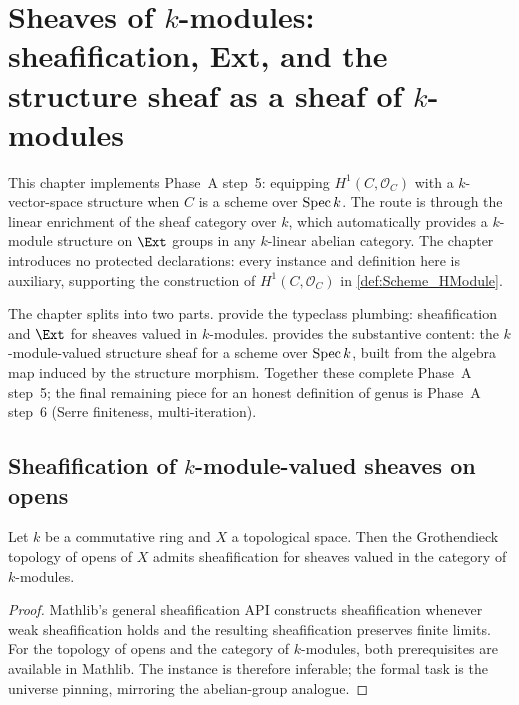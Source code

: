 \chapter{Sheaves of \(k\)-modules: sheafification, Ext, and the structure sheaf as a sheaf of \(k\)-modules}
\label{chap:Cohomology_StructureSheafModuleK}

This chapter implements Phase~A step~5: equipping \(H^1(C, \mathcal O_C)\) with a \(k\)-vector-space structure when \(C\) is a scheme over \(\operatorname{Spec} k\). The route is through the linear enrichment of the sheaf category over \(k\), which automatically provides a \(k\)-module structure on \(\Ext\) groups in any \(k\)-linear abelian category. The chapter introduces no protected declarations: every instance and definition here is auxiliary, supporting the construction of \(H^1(C, \mathcal O_C)\) in \cref{def:Scheme_HModule}.

The chapter splits into two parts.  provide the typeclass plumbing: sheafification and \(\Ext\) for sheaves valued in \(k\)-modules.  provides the substantive content: the \(k\)-module-valued structure sheaf for a scheme over \(\operatorname{Spec} k\), built from the algebra map induced by the structure morphism. Together these complete Phase~A step~5; the final remaining piece for an honest definition of genus is Phase~A step~6 (Serre finiteness, multi-iteration).

\section{Sheafification of \(k\)-module-valued sheaves on opens}
\label{sec:moduleK_prereqs}

\begin{theorem}
  \label{thm:HasSheafify_Opens_ModuleCatK}
  Let \(k\) be a commutative ring and \(X\) a topological space. Then the Grothendieck topology of opens of \(X\) admits sheafification for sheaves valued in the category of \(k\)-modules.
\end{theorem}

\begin{proof}

\leanok
  Mathlib's general sheafification API constructs sheafification whenever weak sheafification holds and the resulting sheafification preserves finite limits. For the topology of opens and the category of \(k\)-modules, both prerequisites are available in Mathlib. The instance is therefore inferable; the formal task is the universe pinning, mirroring the abelian-group analogue.
\end{proof}

